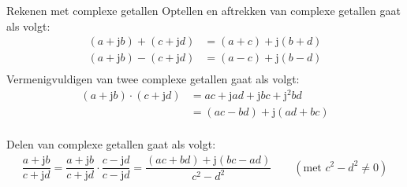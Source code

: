 \documentclass[12pt,fleqn]{article}
\newcommand\imaginaryunit{j}                  %
\newcommand\imunit{\mathrm{\imaginaryunit}}   %
\begin{document}
\begin{infobox}{Rekenen met complexe getallen}
Optellen en aftrekken van complexe getallen gaat als volgt:
%
\begin{equation}
\begin{split}
(a + \imunit b) + (c + \imunit d) &= (a + c) + \imunit(b + d) \\
(a + \imunit b) - (c + \imunit d) &= (a - c) + \imunit(b - d) \\
\end{split}
\end{equation}
%
Vermenigvuldigen van twee complexe getallen gaat als volgt:
%
\begin{equation}
\begin{split}
(a + \imunit b) \cdot (c + \imunit d) &= ac + \imunit ad + \imunit bc + \imunit^2 bd \\
 &= (ac - bd) + \imunit(ad + bc) \\
\end{split}
\end{equation}

%
Delen van complexe getallen gaat als volgt:
%
\begin{equation}
\begin{split}
\dfrac{a+\imunit b}{c+\imunit d} = \dfrac{a+\imunit b}{c+\imunit d} \cdot \dfrac{c-\imunit d}{c-\imunit d} = 
\dfrac{(ac + bd) + \imunit(bc-ad)}{c^2-d^2} \qquad (\text{met }c^2-d^2\neq 0)
\end{split}
\end{equation}
\end{infobox}
\end{document}
